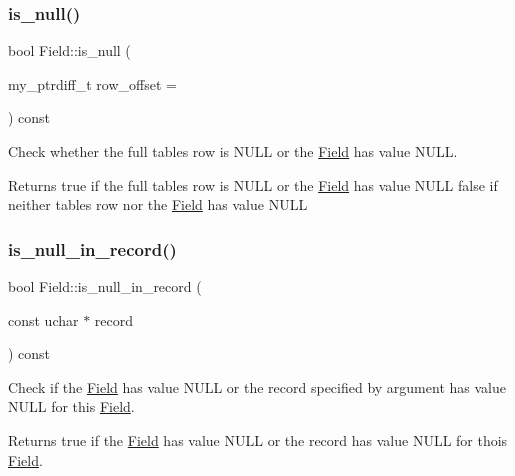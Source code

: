 \mbox{\label{classField_a220543dc491ed2921e8dbde49c83a57f}} 
\subsubsection{\texorpdfstring{is\+\_\+null()}{is\_null()}}
{\footnotesize\ttfamily bool Field\+::is\+\_\+null (\begin{DoxyParamCaption}\item[{my\+\_\+ptrdiff\+\_\+t}]{row\+\_\+offset = {} }\end{DoxyParamCaption}) const\hspace{0.3cm}{\ttfamily [inline]}}

Check whether the full table\textquotesingle{}s row is N\+U\+LL or the \mbox{\hyperlink{classField}{Field}} has value N\+U\+LL.

\begin{DoxyReturn}{Returns}
true if the full table\textquotesingle{}s row is N\+U\+LL or the \mbox{\hyperlink{classField}{Field}} has value N\+U\+LL false if neither table\textquotesingle{}s row nor the \mbox{\hyperlink{classField}{Field}} has value N\+U\+LL 
\end{DoxyReturn}
\mbox{\label{classField_a55777ad76c9c2349f1ce29f5d39606e0}} 
\subsubsection{\texorpdfstring{is\+\_\+null\+\_\+in\+\_\+record()}{is\_null\_in\_record()}}
{\footnotesize\ttfamily bool Field\+::is\+\_\+null\+\_\+in\+\_\+record (\begin{DoxyParamCaption}\item[{const uchar $\ast$}]{record }\end{DoxyParamCaption}) const\hspace{0.3cm}{\ttfamily [inline]}}

Check if the \mbox{\hyperlink{classField}{Field}} has value N\+U\+LL or the record specified by argument has value N\+U\+LL for this \mbox{\hyperlink{classField}{Field}}.

\begin{DoxyReturn}{Returns}
true if the \mbox{\hyperlink{classField}{Field}} has value N\+U\+LL or the record has value N\+U\+LL for thois \mbox{\hyperlink{classField}{Field}}. 
\end{DoxyReturn}
\mbox{\label{classField_a5dcbbd073c69c9ec78ae71607125c876}} 
